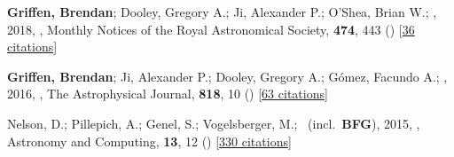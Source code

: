 \item[{\color{numcolor}\scriptsize3}] \textbf{Griffen, Brendan}; Dooley, Gregory A.; Ji, Alexander P.; O'Shea, Brian W.; \etal, 2018, , Monthly Notices of the Royal Astronomical Society, \textbf{474}, 443 () [\href{https://ui.adsabs.harvard.edu/abs/2018MNRAS.474..443G}{36 citations}]

\item[{\color{numcolor}\scriptsize2}] \textbf{Griffen, Brendan}; Ji, Alexander P.; Dooley, Gregory A.; G{\'o}mez, Facundo A.; \etal, 2016, , The Astrophysical Journal, \textbf{818}, 10 () [\href{https://ui.adsabs.harvard.edu/abs/2016ApJ...818...10G}{63 citations}]

\item[{\color{numcolor}\scriptsize1}] Nelson, D.; Pillepich, A.; Genel, S.; Vogelsberger, M.; \etal\ (incl.\ \textbf{BFG}), 2015, , Astronomy and Computing, \textbf{13}, 12 () [\href{https://ui.adsabs.harvard.edu/abs/2015A&C....13...12N}{330 citations}]